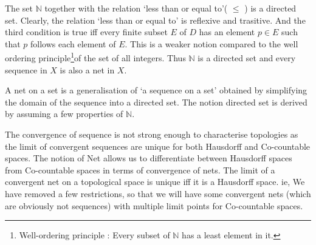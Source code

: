 \begin{remark}
\begin{commentary}
	The set \( \mathbb{N} \) together with the relation `less than or equal to'( \( \le \) ) is a directed set. Clearly, the relation `less than or equal to' is reflexive and trasitive. And the third condition is true iff every finite subset \( E \) of \( D \) has an element \( p \in E \) such that \( p \) follows each element of \( E \). This is a weaker notion compared to the well ordering principle\footnote{Well-ordering principle : Every subset of \( \mathbb{N} \) has a least element in it.}of the set of all integers. Thus \( \mathbb{N} \) is a directed set and every sequence in \( X \) is also a net in \( X \).
\end{commentary}
\end{remark}

\begin{remark}
\begin{commentary}
	\par A net on a set is a generalisation of `a sequence on a set' obtained by simplifying the domain of the sequence into a directed set. The notion directed set is derived by assuming a few properties of \( \mathbb{N} \).\\

	\par The convergence of sequence is not strong enough to characterise topologies as the limit of convergent sequences are unique for both Hausdorff and Co-countable spaces. The notion of Net allows us to differentiate between Hausdorff spaces from Co-countable spaces in terms of convergence of nets. The limit of a convergent net on a topological space is unique iff it is a Hausdorff space. ie, We have removed a few restrictions, so that we will have some convergent nets (which are obviously not sequences) with multiple limit points for Co-countable spaces.
\end{commentary}
\end{remark}

